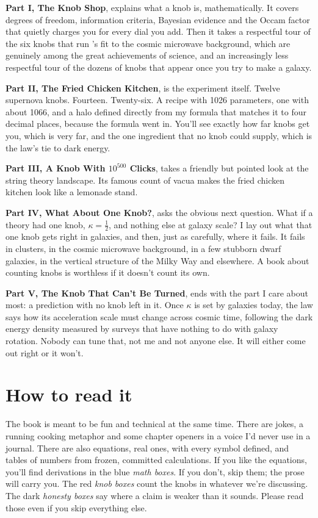 \textbf{Part I, The Knob Shop}, explains what a knob is, mathematically. It covers degrees of freedom, information criteria, Bayesian evidence and the Occam factor that quietly charges you for every dial you add. Then it takes a respectful tour of the six knobs that run \LCDM's fit to the cosmic microwave background, which are genuinely among the great achievements of science, and an increasingly less respectful tour of the dozens of knobs that appear once you try to make a galaxy.

\textbf{Part II, The Fried Chicken Kitchen}, is the experiment itself. Twelve supernova knobs. Fourteen. Twenty-six. A recipe with 1026 parameters, one with about 1066, and a halo defined directly from my formula that matches it to four decimal places, because the formula went in. You'll see exactly how far knobs get you, which is very far, and the one ingredient that no knob could supply, which is the law's tie to dark energy.

\textbf{Part III, A Knob With $10^{500}$ Clicks}, takes a friendly but pointed look at the string theory landscape. Its famous count of vacua makes the fried chicken kitchen look like a lemonade stand.

\textbf{Part IV, What About One Knob?}, asks the obvious next question. What if a theory had one knob, $\kappa=\tfrac12$, and nothing else at galaxy scale? I lay out what that one knob gets right in galaxies, and then, just as carefully, where it fails. It fails in clusters, in the cosmic microwave background, in a few stubborn dwarf galaxies, in the vertical structure of the Milky Way and elsewhere. A book about counting knobs is worthless if it doesn't count its own.

\textbf{Part V, The Knob That Can't Be Turned}, ends with the part I care about most: a prediction with no knob left in it. Once $\kappa$ is set by galaxies today, the law says how its acceleration scale must change across cosmic time, following the dark energy density measured by surveys that have nothing to do with galaxy rotation. Nobody can tune that, not me and not anyone else. It will either come out right or it won't.

\section*{How to read it}

The book is meant to be fun and technical at the same time. There are jokes, a running cooking metaphor and some chapter openers in a voice I'd never use in a journal. There are also equations, real ones, with every symbol defined, and tables of numbers from frozen, committed calculations. If you like the equations, you'll find derivations in the blue \emph{math boxes}. If you don't, skip them; the prose will carry you. The red \emph{knob boxes} count the knobs in whatever we're discussing. The dark \emph{honesty boxes} say where a claim is weaker than it sounds. Please read those even if you skip everything else.


